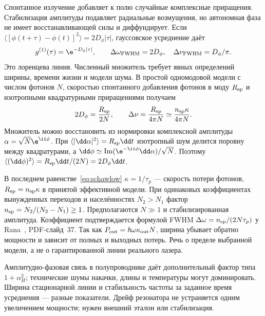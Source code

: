 
Спонтанное излучение добавляет к полю случайные комплексные приращения. Стабилизация амплитуды подавляет радиальные возмущения, но автономная фаза не имеет восстанавливающей силы и диффундирует. Если $\langle[\phi(t+\tau)-\phi(t)]^2\rangle=2D_\phi|\tau|$, гауссовское усреднение даёт
\begin{equation}
 g^{(1)}(\tau)=\e^{-D_\phi|\tau|},\qquad
 \Delta\omega_{\rm FWHM}=2D_\phi,\quad \Delta\nu_{\rm FWHM}=D_\phi/\pi.
\end{equation}
Это лоренцева линия. Численный множитель требует явных определений ширины, времени жизни и модели шума. В простой одномодовой модели с числом фотонов $N$, скоростью спонтанного добавления фотонов в моду $R_{\rm sp}$ и изотропными квадратурными приращениями получаем
\begin{equation}\label{eq:schawlow}
 2D_\phi=\frac{R_{\rm sp}}{2N},\qquad
 \Delta\nu=\frac{R_{\rm sp}}{4\pi N}
 \simeq\frac{n_{\rm sp}\kappa}{4\pi N}.
\end{equation}
Множитель можно восстановить из нормировки комплексной амплитуды $\alpha=\sqrt N\e^{\ii\phi}$. При $\langle|\dd\alpha|^2\rangle=R_{\rm sp}\dd t$ изотропный шум делится поровну между квадратурами, а $\dd\phi\simeq\operatorname{Im}(\e^{-\ii\phi}\dd\alpha)/\sqrt N$. Поэтому $\langle(\dd\phi)^2\rangle=R_{\rm sp}\dd t/(2N)=2D_\phi\dd t$.

В последнем равенстве~\eqref{eq:schawlow} $\kappa=1/\tau_p$ — скорость потери фотонов, $R_{\rm sp}=n_{\rm sp}\kappa$ в принятой эффективной модели. При одинаковых коэффициентах вынужденных переходов и населённостях $N_2>N_1$ фактор $n_{\rm sp}=N_2/(N_2-N_1)\geq1$. Предполагаются $N\gg1$ и стабилизированная амплитуда. Коэффициент подтверждается формулой FWHM $\Delta\omega=n_{\rm sp}/(2N\tau_p)$ у Rana~\cite{rana}, PDF-слайд~37. Так как $P_{\rm out}=\hbar\omega\kappa_{\rm out}N$, ширина убывает обратно мощности и зависит от полных и выходных потерь. Речь о пределе выбранной модели, а не о гарантированной линии реального лазера.

Амплитудно-фазовая связь в полупроводнике даёт дополнительный фактор типа $1+\alpha_H^2$; технические шумы накачки, длины и температуры могут доминировать. Ширина стационарной линии и стабильность частоты за заданное время усреднения — разные показатели. Дрейф резонатора не устраняется одним увеличением мощности; нужен внешний эталон или стабилизация.

